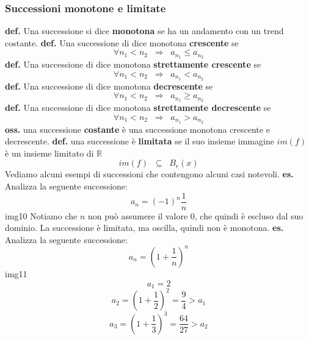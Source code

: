 \subsubsection*{Successioni monotone e limitate}
\textbf{def.} Una successione si dice \textbf{monotona} se ha un andamento con un trend costante.
\newline
\newline
\textbf{def.} Una successione di dice monotona \textbf{crescente} se
\[
    \forall n_1 < n_2 \;\; \Rightarrow \;\; a_{n_{1}} \leq a_{n_{2}}
\]
\newline
\newline
\textbf{def.} Una successione di dice monotona \textbf{strettamente crescente} se
\[
    \forall n_1 < n_2 \;\; \Rightarrow \;\; a_{n_{1}} < a_{n_{2}}
\]
\newline
\newline
\textbf{def.} Una successione di dice monotona \textbf{decrescente} se
\[
    \forall n_1 < n_2 \;\; \Rightarrow \;\; a_{n_{1}} \geq a_{n_{2}}
\]
\newline
\newline
\textbf{def.} Una successione di dice monotona \textbf{strettamente decrescente} se
\[
    \forall n_1 < n_2 \;\; \Rightarrow \;\; a_{n_{1}} > a_{n_{2}}
\]
\newline
\textbf{oss.} una successione \textbf{costante} è una successione monotona crescente e decrescente.
\newline
\newline
\textbf{def.} una successione è \textbf{limitata} se il suo insieme immagine $im(f)$ è un insieme limitato di $\mathbb{R}$
\[
    im(f) \;\;\subseteq\;\; B_r(x)
\]
\newline
\newline
Vediamo alcuni esempi di successioni che contengono alcuni casi notevoli.
\newline
\newline
\textbf{es.} Analizza la seguente successione:
\[
    a_n = (-1)^n \frac{1}{n}
\]
img10
\newline
Notiamo che $n$ non può assumere il valore $0$, che quindi è escluso dal suo dominio. La successione è limitata, ma oscilla, quindi non è monotona.
\newline
\newline
\textbf{es.} Analizza la seguente successione:
\[
    a_n= \left(1+\frac{1}{n}\right)^n
\]
img11
\newline
\[
    a_1 = 2
\]
\[
    a_2 = (1 + \frac{1}{2})^2 = \frac{9}{4} > a_1
\]
\[
    a_3 = (1 + \frac{1}{3})^3 = \frac{64}{27} > a_2
\]
